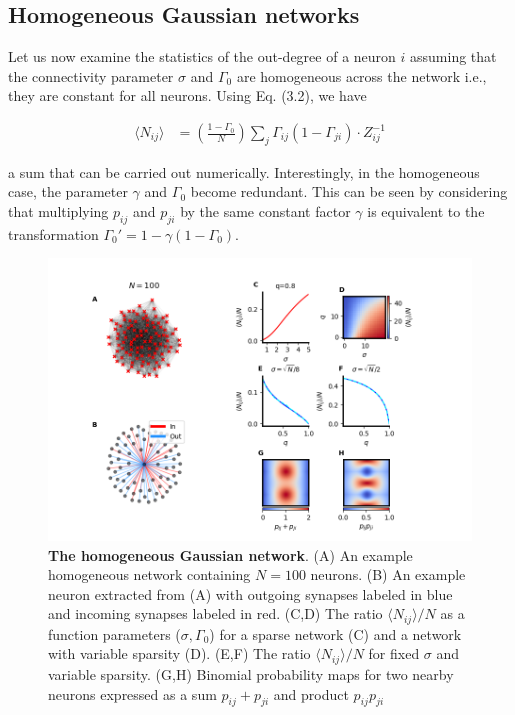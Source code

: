 \documentclass{ucetd}
\begin{document}
\subsection{Homogeneous Gaussian networks}

Let us now examine the statistics of the out-degree of a neuron $i$ assuming that the connectivity parameter $\sigma$ and $\Gamma_{0}$ are homogeneous across the network i.e., they are constant for all neurons. Using Eq. (3.2), we have

\begin{align}
\langle N_{ij} \rangle &= \left(\frac{1-\Gamma_{0}}{N}\right)\sum_{j} \Gamma_{ij}(1-\Gamma_{ji})\cdot Z_{ij}^{-1}
\end{align}

a sum that can be carried out numerically. Interestingly, in the homogeneous case, the parameter $\gamma$ and $\Gamma_{0}$ become redundant. This can be seen by considering that multiplying $p_{ij}$ and $p_{ji}$ by the same constant factor $\gamma$ is equivalent to the transformation $\Gamma_{0}' = 1-\gamma(1-\Gamma_{0})$. 

\clearpage
\begin{figure}[t!]
\centering
\includegraphics[width=175mm]{fig_8}
\caption{\textbf{The homogeneous Gaussian network}. (A) An example homogeneous network containing $N=100$ neurons. (B) An example neuron extracted from (A) with outgoing synapses labeled in blue and incoming synapses labeled in red. (C,D) The ratio $\langle N_{ij}\rangle/N$ as a function parameters ($\sigma, \Gamma_{0}$) for a sparse network (C) and a network with variable sparsity (D). (E,F) The ratio $\langle N_{ij}\rangle/N$ for fixed $\sigma$ and variable sparsity. (G,H) Binomial probability maps for two nearby neurons expressed as a sum $p_{ij}+p_{ji}$ and product $p_{ij}p_{ji}$}
\end{figure}
\end{document}
